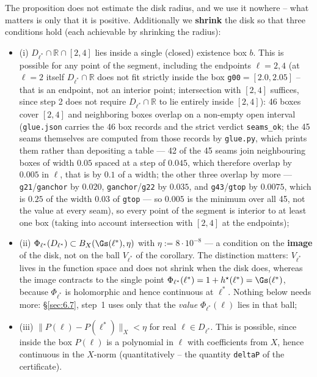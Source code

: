 The proposition does not estimate the disk radius, and we use it nowhere -- what matters is only that it is positive. Additionally we \textbf{shrink} the disk so that three conditions hold (each achievable by shrinking the radius):

\begin{itemize}
\item (i) $D_{\ell^{\ast}}\cap\mathbb R\cap[2,4]$ lies inside a single (closed) existence box $b$. This is possible for any point of the segment, including the endpoints $\ell=2,4$ (at $\ell=2$ itself $D_{\ell^{\ast}}\cap\mathbb R$ does not fit strictly inside the box \texttt{g00}$=[2.0,2.05]$ -- that is an endpoint, not an interior point; intersection with $[2,4]$ suffices, since step 2 does not require $D_{\ell^{\ast}}\cap\mathbb R$ to lie entirely inside $[2,4]$): 46 boxes cover $[2,4]$ and neighboring boxes overlap on a non-empty open interval (\texttt{glue.json} carries the 46 box records and the strict verdict \texttt{seams\_ok}; the 45 seams themselves are computed from those records by \texttt{glue.py}, which prints them rather than depositing a table --- 42 of the 45 seams join neighbouring boxes of width $0.05$ spaced at a step of $0.045$, which therefore overlap by $0.005$ in $\ell$, that is by $0.1$ of a width; the other three overlap by more --- \texttt{g21}/\texttt{ganchor} by $0.020$, \texttt{ganchor}/\texttt{g22} by $0.035$, and \texttt{g43}/\texttt{gtop} by $0.0075$, which is $0.25$ of the width $0.03$ of \texttt{gtop} --- so $0.005$ is the minimum over all 45, not the value at every seam), so every point of the segment is interior to at least one box (taking into account intersection with $[2,4]$ at the endpoints);
\item (ii) $\Phi_{\ell^{\ast}}(D_{\ell^{\ast}})\subset B_X(\Gs(\ell^{\ast}),\eta)$ with $\eta:=8\cdot10^{-8}$ --- a condition on the \textbf{image} of the disk, not on the ball $V_{\ell^{\ast}}$ of the corollary. The distinction matters: $V_{\ell^{\ast}}$ lives in the function space and does not shrink when the disk does, whereas the image contracts to the single point $\Phi_{\ell^{\ast}}(\ell^{\ast})=1+h^{\star}(\ell^{\ast})=\Gs(\ell^{\ast})$, because $\Phi_{\ell^{\ast}}$ is holomorphic and hence continuous at $\ell^{\ast}$. Nothing below needs more: \S\ref{sec:6.7}, step~1 uses only that the \emph{value} $\Phi_{\ell^{\ast}}(\ell)$ lies in that ball;
\item (iii) $\|P(\ell)-P(\ell^{\ast})\|_X<\eta$ for real $\ell\in D_{\ell^{\ast}}$. This is possible, since inside the box $P(\ell)$ is a polynomial in $\ell$ with coefficients from $X$, hence continuous in the $X$-norm (quantitatively -- the quantity \texttt{deltaP} of the certificate).
\end{itemize}

